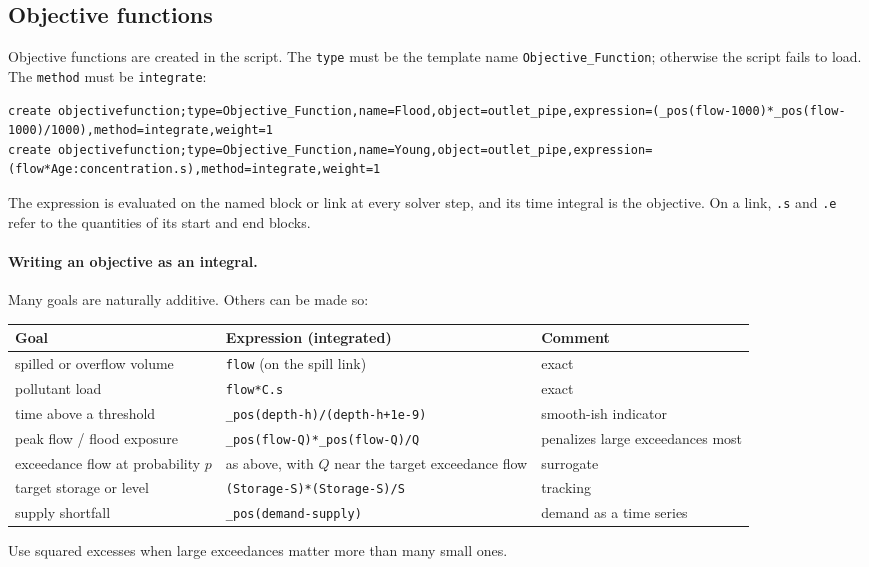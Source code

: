 \documentclass[11pt]{article}
\newcommand{\code}[1]{\texttt{#1}}
\begin{document}
\subsection{Objective functions}
\label{sec:objectives}
Objective functions are created in the script. The \code{type} must be the
template name \code{Objective\_Function}; otherwise the script fails to
load. The \code{method} must be \code{integrate}:
\begin{lstlisting}
create objectivefunction;type=Objective_Function,name=Flood,object=outlet_pipe,expression=(_pos(flow-1000)*_pos(flow-1000)/1000),method=integrate,weight=1
create objectivefunction;type=Objective_Function,name=Young,object=outlet_pipe,expression=(flow*Age:concentration.s),method=integrate,weight=1
\end{lstlisting}
The expression is evaluated on the named block or link at every solver
step, and its time integral is the objective. On a link, \code{.s} and
\code{.e} refer to the quantities of its start and end blocks.

\paragraph{Writing an objective as an integral.} Many goals are naturally
additive. Others can be made so:
\begin{center}\small
\begin{tabular}{@{}p{4.4cm}p{6.2cm}p{3.6cm}@{}}
\toprule
Goal & Expression (integrated) & Comment\\
\midrule
spilled or overflow volume & \code{flow} (on the spill link) & exact\\
pollutant load & \code{flow*C.s} & exact\\
time above a threshold & \code{\_pos(depth-h)/(depth-h+1e-9)} & smooth-ish indicator\\
peak flow / flood exposure & \code{\_pos(flow-Q)*\_pos(flow-Q)/Q} & penalizes large exceedances most\\
exceedance flow at probability $p$ & as above, with $Q$ near the target exceedance flow & surrogate\\
target storage or level & \code{(Storage-S)*(Storage-S)/S} & tracking\\
supply shortfall & \code{\_pos(demand-supply)} & demand as a time series\\
\bottomrule
\end{tabular}
\end{center}
Use squared excesses when large exceedances matter more than many small
ones.
\end{document}
